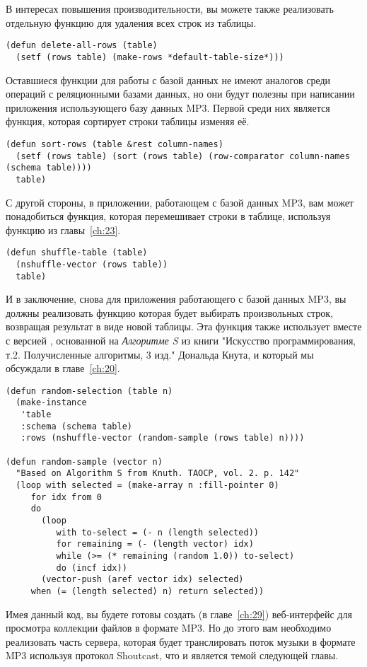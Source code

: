 В интересах повышения производительности, вы можете также реализовать отдельную функцию
для удаления всех строк из таблицы.

\begin{lstlisting}
(defun delete-all-rows (table)
  (setf (rows table) (make-rows *default-table-size*)))
\end{lstlisting}

Оставшиеся функции для работы с базой данных не имеют аналогов среди операций с
реляционными базами данных, но они будут полезны при написании приложения использующего
базу данных MP3.  Первой среди них является функция, которая сортирует строки таблицы
изменяя её.

\begin{lstlisting}
(defun sort-rows (table &rest column-names)
  (setf (rows table) (sort (rows table) (row-comparator column-names (schema table))))
  table)
\end{lstlisting}

С другой стороны, в приложении, работающем с базой данных MP3, вам может понадобиться
функция, которая перемешивает строки в таблице, используя функцию 
из главы~\ref{ch:23}.

\begin{lstlisting}
(defun shuffle-table (table)
  (nshuffle-vector (rows table))
  table)
\end{lstlisting}

И в заключение, снова для приложения работающего с базой данных MP3, вы должны реализовать
функцию которая будет выбирать  произвольных строк, возвращая результат в виде
новой таблицы.  Эта функция также использует  вместе с версией
, основанной на \textit{Алгоритме S} из книги "Искусство
программирования, т.2.  Получисленные алгоритмы, 3 изд." Дональда Кнута, и который мы
обсуждали в главе~\ref{ch:20}.

\begin{lstlisting}
(defun random-selection (table n)
  (make-instance
   'table
   :schema (schema table)
   :rows (nshuffle-vector (random-sample (rows table) n))))

(defun random-sample (vector n)
  "Based on Algorithm S from Knuth. TAOCP, vol. 2. p. 142"
  (loop with selected = (make-array n :fill-pointer 0)
     for idx from 0
     do
       (loop
          with to-select = (- n (length selected))
          for remaining = (- (length vector) idx)
          while (>= (* remaining (random 1.0)) to-select)
          do (incf idx))
       (vector-push (aref vector idx) selected)
     when (= (length selected) n) return selected))
\end{lstlisting}

Имея данный код, вы будете готовы создать (в главе~\ref{ch:29}) веб-интерфейс для
просмотра коллекции файлов в формате MP3.  Но до этого вам необходимо реализовать часть
сервера, которая будет транслировать поток музыки в формате MP3 используя протокол
Shoutcast, что и является темой следующей главы.

